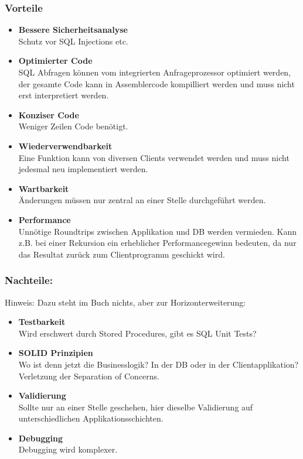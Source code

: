 \subsubsection{Vorteile}
\begin{itemize}
    \item \textbf{Bessere Sicherheitsanalyse} \\
        Schutz vor SQL Injections etc.
    \item \textbf{Optimierter Code} \\
        SQL Abfragen können vom integrierten Anfrageprozessor optimiert werden, der gesamte Code kann in Assemblercode kompilliert werden und muss nicht erst interpretiert werden.
    \item \textbf{Konziser Code} \\
        Weniger Zeilen Code benötigt.
    \item \textbf{Wiederverwendbarkeit} \\
        Eine Funktion kann von diversen Clients verwendet werden und muss nicht jedesmal neu implementiert werden.
    \item \textbf{Wartbarkeit} \\
        Änderungen müssen nur zentral an einer Stelle durchgeführt werden.
    \item \textbf{Performance} \\
        Unnötige Roundtrips zwischen Applikation und DB werden vermieden. Kann z.B. bei einer Rekursion ein erheblicher Performancegewinn bedeuten, da nur das Resultat zurück zum Clientprogramm geschickt wird.    
\end{itemize}

\subsubsection{Nachteile:}
Hinweis: Dazu steht im Buch nichts, aber zur Horizonterweiterung:
\begin{itemize}
    \item \textbf{Testbarkeit} \\
    Wird erschwert durch Stored Procedures, gibt es SQL Unit Tests?
    \item \textbf{SOLID Prinzipien} \\
    Wo ist denn jetzt die Businesslogik? In der DB oder in der Clientapplikation? Verletzung der Separation of Concerns.
    \item \textbf{Validierung} \\
    Sollte nur an einer Stelle geschehen, hier dieselbe Validierung auf unterschiedlichen Applikationsschichten.
    \item \textbf{Debugging} \\
    Debugging wird komplexer.
\end{itemize}


